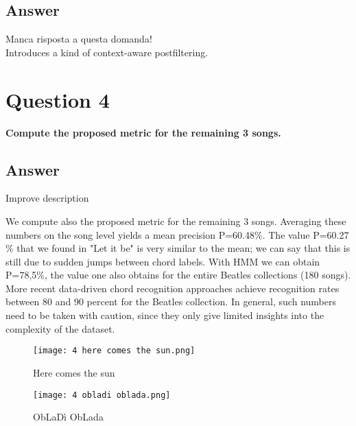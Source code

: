 \documentclass{article}
\begin{document}
\subsection*{\color{blue}Answer}

\color{red}Manca risposta a questa domanda!\color{black}\\
Introduces a kind of context-aware postfiltering.


\section*{\color{red}Question 4}

\begin{problem}
	\textbf{Compute the proposed metric for the remaining 3 songs.}
\end{problem}

\subsection*{\color{blue}Answer}

\color{red}Improve description\color{black}

We compute also the proposed metric for the remaining 3 songs.
Averaging these numbers on the song level yields a mean precision P=60.48\begin{math}\% \end{math}. The value P=60.27\begin{math}\% \end{math} that we found in "Let it be" is very similar to the mean; we can say that this is still due to sudden jumps between chord labels. With HMM we can obtain P=78,5\begin{math}\% \end{math}, the value one also obtains for the entire Beatles collections (180 songs). More recent data-driven chord recognition approaches achieve recognition rates between 80 and 90 percent for the Beatles collection. In general, such numbers need to be taken with caution, since they only give limited insights into the complexity of the dataset.

\begin{figure}[H]
 \centering
 \texttt{[image: 4 here comes the sun.png]}
 \caption{Here comes the sun}
\end{figure}

\begin{figure}[H]
 \centering
 \texttt{[image: 4 obladi oblada.png]}
 \caption{ObLaDì ObLada}
\end{figure}
\end{document}
